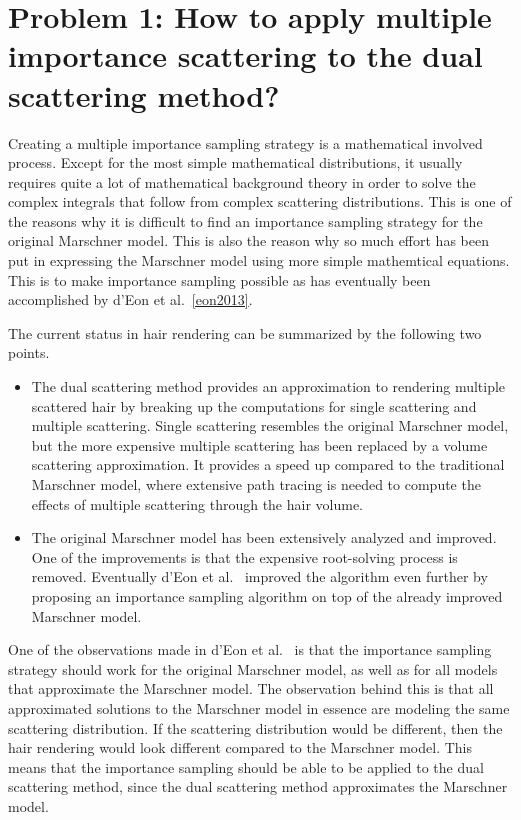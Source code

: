 \documentclass[11pt,a4paper]{report}
\begin{document}
\section{Problem 1: How to apply multiple importance scattering to the dual scattering method?}
\label{approach_problem1}

Creating a multiple importance sampling strategy is a mathematical involved process. Except for the most simple mathematical distributions, it usually requires quite a lot of mathematical background theory in order to solve the complex integrals that follow from complex scattering distributions. This is one of the reasons why it is difficult to find an importance sampling strategy for the original Marschner model. This is also the reason why so much effort has been put in expressing the Marschner model using more simple mathemtical equations. This is to make importance sampling possible as has eventually been accomplished by d'Eon et al.~\ref{eon2013}.

The current status in hair rendering can be summarized by the following two points.

\begin{itemize}
    \item The dual scattering method provides an approximation to rendering multiple scattered hair by breaking up the computations for single scattering and multiple scattering. Single scattering resembles the original Marschner model, but the more expensive multiple scattering has been replaced by a volume scattering approximation. It provides a speed up compared to the traditional Marschner model, where extensive path tracing is needed to compute the effects of multiple scattering through the hair volume.
    \item The original Marschner model has been extensively analyzed and improved. One of the improvements is that the expensive root-solving process is removed. Eventually d'Eon et al.~\cite{eon2013} improved the algorithm even further by proposing an importance sampling algorithm on top of the already improved Marschner model.
\end{itemize}

One of the observations made in d'Eon et al.~\cite{eon2013} is that the importance sampling strategy should work for the original Marschner model, as well as for all models that approximate the Marschner model. The observation behind this is that all approximated solutions to the Marschner model in essence are modeling the same scattering distribution. If the scattering distribution would be different, then the hair rendering would look different compared to the Marschner model. This means that the importance sampling should be able to be applied to the dual scattering method, since the dual scattering method approximates the Marschner model.
\end{document}
